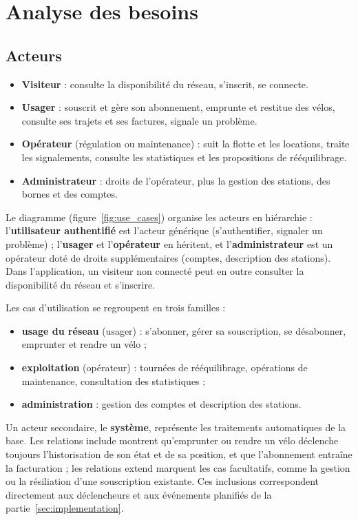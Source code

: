 \section{Analyse des besoins}\label{sec:besoins}

\subsection{Acteurs}

\begin{itemize}
	\item \textbf{Visiteur} : consulte la disponibilité du réseau, s'inscrit, se connecte.
	\item \textbf{Usager} : souscrit et gère son abonnement, emprunte et restitue des vélos, consulte ses trajets et ses factures, signale un problème.
	\item \textbf{Opérateur} (régulation ou maintenance) : suit la flotte et les locations, traite les signalements, consulte les statistiques et les propositions de rééquilibrage.
	\item \textbf{Administrateur} : droits de l'opérateur, plus la gestion des stations, des bornes et des comptes.
\end{itemize}


Le diagramme (figure~\ref{fig:use_cases}) organise les acteurs en hiérarchie : l'\textbf{utilisateur authentifié} est l'acteur générique (s'authentifier, signaler un problème) ; l'\textbf{usager} et l'\textbf{opérateur} en héritent, et l'\textbf{administrateur} est un opérateur doté de droits supplémentaires (comptes, description des stations). Dans l'application, un visiteur non connecté peut en outre consulter la disponibilité du réseau et s'inscrire.

Les cas d'utilisation se regroupent en trois familles :
\begin{itemize}
	\item \textbf{usage du réseau} (usager) : s'abonner, gérer sa souscription, se désabonner, emprunter et rendre un vélo ;
	\item \textbf{exploitation} (opérateur) : tournées de rééquilibrage, opérations de maintenance, consultation des statistiques ;
	\item \textbf{administration} : gestion des comptes et description des stations.
\end{itemize}

Un acteur secondaire, le \textbf{système}, représente les traitements automatiques de la base. Les relations \og include \fg{} montrent qu'emprunter ou rendre un vélo déclenche toujours l'historisation de son état et de sa position, et que l'abonnement entraîne la facturation ; les relations \og extend \fg{} marquent les cas facultatifs, comme la gestion ou la résiliation d'une souscription existante. Ces inclusions correspondent directement aux déclencheurs et aux événements planifiés de la partie~\ref{sec:implementation}.


